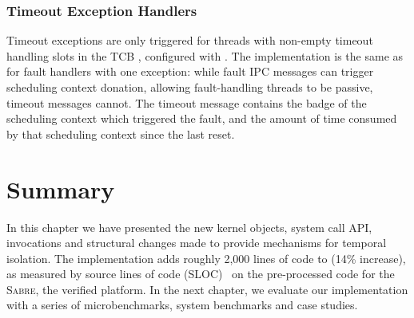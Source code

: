 \subsubsection{Timeout Exception Handlers}

Timeout exceptions are only triggered for threads with non-empty timeout handling slots in the
\gls{TCB} \cnode, configured with \tcbsettimeoutep. The implementation is the same as for
fault handlers with one exception: while fault \gls{IPC} messages can trigger scheduling context
donation, allowing fault-handling threads to be passive, timeout messages cannot. The timeout
message contains the badge of the scheduling context which triggered the fault, and the amount of
time consumed by that scheduling context since the last reset.

\section{Summary}

In this chapter we have presented the new kernel objects, system call API, invocations and 
structural changes made to provide mechanisms for temporal isolation. 
The implementation adds roughly 2,000 lines of code to \selfour (14\% increase), as measured
by source lines of code (SLOC)~\citep{Wheeler_01} on the pre-processed code for the \textsc{Sabre}, the verified platform.
In the next chapter, we evaluate our implementation with a series of microbenchmarks, 
system benchmarks and case studies.


